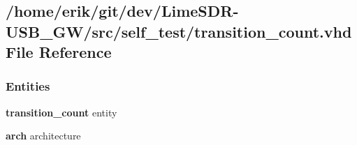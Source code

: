 \subsection{/home/erik/git/dev/\+Lime\+S\+D\+R-\/\+U\+S\+B\+\_\+\+G\+W/src/self\+\_\+test/transition\+\_\+count.vhd File Reference}
\label{transition__count_8vhd}
\subsubsection*{Entities}
\begin{DoxyCompactItemize}
\item 
{\bf transition\+\_\+count} entity
\item 
{\bf arch} architecture
\end{DoxyCompactItemize}
